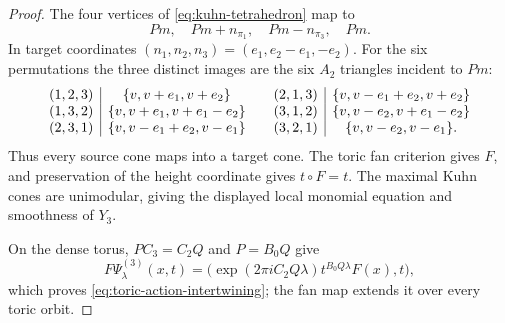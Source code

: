 \documentclass[11pt]{article}
\theoremstyle{definition}
\begin{document}
\begin{proof}
The four vertices of \eqref{eq:kuhn-tetrahedron} map to
\[
 Pm,\quad Pm+n_{\pi_1},\quad Pm-n_{\pi_3},\quad Pm.
\]
In target coordinates
$(n_1,n_2,n_3)=(e_1,e_2-e_1,-e_2)$.  For the six permutations the three
distinct images are the six $A_2$ triangles incident to $Pm$:
\[
\begin{array}{c|c@{\qquad}c|c}
(1,2,3)&\{v,v+e_1,v+e_2\}&(2,1,3)&\{v,v-e_1+e_2,v+e_2\}\\
(1,3,2)&\{v,v+e_1,v+e_1-e_2\}&(3,1,2)&\{v,v-e_2,v+e_1-e_2\}\\
(2,3,1)&\{v,v-e_1+e_2,v-e_1\}&(3,2,1)&\{v,v-e_2,v-e_1\}.
\end{array}
\]
Thus every source cone maps into a target cone.  The toric fan criterion
gives $F$, and preservation of the height coordinate gives $t\circ F=t$.
The maximal Kuhn cones are unimodular, giving the displayed local monomial
equation and smoothness of $Y_3$.

On the dense torus, $PC_3=C_2Q$ and $P=B_0Q$ give
\[
 F\Psi^{(3)}_\lambda(x,t)
 =\bigl(\exp(2\pi iC_2Q\lambda)t^{B_0Q\lambda}F(x),t\bigr),
\]
which proves \eqref{eq:toric-action-intertwining}; the fan map extends it
over every toric orbit.


\end{proof}
\end{document}
